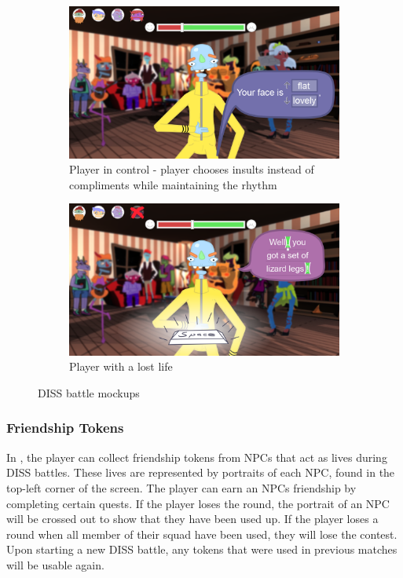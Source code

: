\begin{figure}[H]
  \begin{subfigure}{.44\textwidth}
    \centering
    \includegraphics[width=.9\linewidth]{images/UI_yelling_offense}
    \caption{Player in control - player chooses insults instead of compliments while maintaining the rhythm}
    \label{fig:yelling_contest_c}
  \end{subfigure} %
	\begin{subfigure}{.44\textwidth}
	  \centering
	  \includegraphics[width=.9\linewidth]{images/UI_yelling_lifelost}
	  \caption{Player with a lost life}
	  \label{fig:yelling_contest_c}
	\end{subfigure}%
  \caption{DISS battle mockups}
  \label{fig:yelling_contest}
\end{figure}

\subsubsection{Friendship Tokens}
In \ourgame{}, the player can collect friendship tokens from NPCs that act as lives during DISS battles. These lives are represented by portraits of each NPC, found in the top-left corner of the screen. The player can earn an NPCs friendship by completing certain quests. If the player loses the round, the portrait of an NPC will be crossed out to show that they have been used up. If the player loses a round when all member of their squad have been used, they will lose the contest. Upon starting a new DISS battle, any tokens that were used in previous matches will be usable again.

